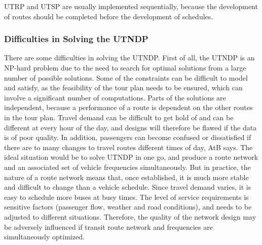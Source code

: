 UTRP and UTSP are usually implemented sequentially, because the development of routes should be completed before the development of schedules. 

\subsubsection{Difficulties in Solving the UTNDP}
There are some difficulties in solving the UTNDP. First of all, the UTNDP is an NP-hard problem due to the need to search for optimal solutions from a large number of possible solutions. Some of the constraints can be difficult to model and satisfy, as the feasibility of the tour plan needs to be ensured, which can involve a significant number of computations. Parts of the solutions are independent, because a performance of a route is dependent on the other routes in the tour plan. Travel demand can be difficult to get hold of and can be different at every hour of the day, and designs will therefore be flawed if the data is of poor quality. In addition, passengers can become confused or dissatisfied if there are to many changes to travel routes different times of day, AtB says. The ideal situation would be to solve UTNDP in one go, and produce a route network and an associated set of vehicle frequencies simultaneously. But in practice, the nature of a route network means that, once established, it is much more stable and difficult to change than a vehicle schedule. Since travel demand varies, it is easy to schedule more buses at busy times. The level of service requirements is sensitive factors (passenger flow, weather and road conditions), and needs to be adjusted to different situations. Therefore, the quality of the network design may be adversely influenced if transit route network and frequencies are simultaneously optimized. 





